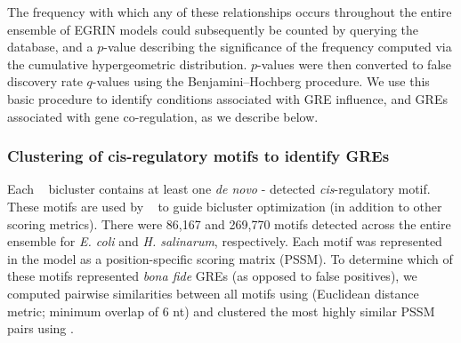 
\noindent The frequency with which any of these relationships occurs throughout the
 entire ensemble of EGRIN models could subsequently be counted by
 querying the database, and a $p$-value describing the significance of
 the frequency computed via the cumulative hypergeometric
 distribution. $p$-values were then converted to false discovery rate
 $q$-values using the Benjamini–Hochberg procedure.  We use this
basic procedure to identify conditions associated with GRE influence,
and GREs associated with gene co-regulation, as we describe below.


\subsubsection{Clustering of cis-regulatory motifs to identify GREs}
\label{section:gres}

Each \cm~ bicluster contains at least one {\it de novo} \MEME -
detected \cite{Bailey1998} {\it cis}-regulatory motif. These motifs
are used by \cm~ to guide bicluster optimization (in addition to other
scoring metrics). There were 86,167 and 269,770 motifs detected across
the entire ensemble for {\it E. coli} and {\it H. salinarum},
respectively. Each motif was represented in the model as a
position-specific scoring matrix (PSSM). To determine which of these
motifs represented \textit{bona fide} GREs (as opposed to false positives), we
computed pairwise similarities between all motifs using  
\cite{Gupta2007} (Euclidean distance metric; minimum overlap of 6 nt) 
and clustered the most highly similar PSSM pairs
using  \cite{vanDongen2012}. 

